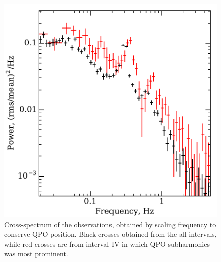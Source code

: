 \documentclass[a4paper,fleqn,usenatbib]{mnras}
\begin{document}
\begin{figure}
        \includegraphics[width=\columnwidth]{subharmonics2.pdf}
        \caption{Cross-spectrum of the observations, obtained by scaling frequency to conserve QPO position.
        Black crosses obtained from the all intervals, while red crosses are from interval IV in which QPO subharmonics was most prominent.}
        \label{fig:cospec_tracked}
\end{figure}
\end{document}
